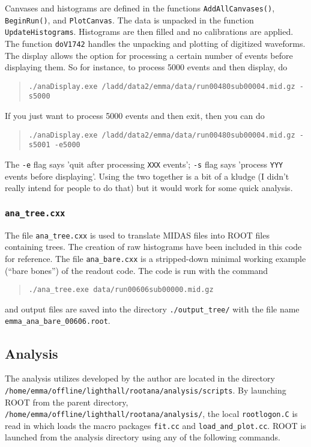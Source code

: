 Canvases and histograms are defined in the functions \texttt{AddAllCanvases()}, \texttt{BeginRun()}, and \texttt{PlotCanvas}. The data is unpacked in the function \texttt{UpdateHistograms}. Histograms are then filled and no calibrations are applied. The function \texttt{doV1742} handles the unpacking and plotting of digitized waveforms.
The display allows the option for processing a certain number of events before displaying them.  So for instance, to process 5000 events and then display, do
\begin{quote}
  \begin{Verbatim}
./anaDisplay.exe /ladd/data2/emma/data/run00480sub00004.mid.gz -s5000
\end{Verbatim}
\end{quote}
If you just want to process 5000 events and then exit, then you can do
\begin{quote}
  \begin{Verbatim}
./anaDisplay.exe /ladd/data2/emma/data/run00480sub00004.mid.gz -s5001 -e5000
\end{Verbatim}
\end{quote}
The \texttt{-e} flag says 'quit after processing \texttt{XXX} events'; \texttt{-s} flag says 'process \texttt{YYY} events before displaying'. Using the two together is a bit of a kludge (I didn't really intend for people to do that) but it would work for some quick analysis.

\subsubsection{\texttt{ana\_tree.cxx}}
The file \texttt{ana\_tree.cxx} is used to translate MIDAS files into ROOT files containing trees. The creation of raw histograms have been included in this code for reference.
The file  \texttt{ana\_bare.cxx} is a stripped-down minimal working example (``bare bones'') of the readout code. 
The code is run with the command
\begin{quote}
  \begin{Verbatim}
./ana_tree.exe data/run00606sub00000.mid.gz   
\end{Verbatim}
\end{quote}
and output files are saved into the directory \verb|./output_tree/| with the file name \verb|emma_ana_bare_00606.root|.
\subsection{Analysis}
The analysis utilizes developed by the author are located in the directory \verb|/home/emma/offline/lighthall/rootana/analysis/scripts|. By launching ROOT from the parent directory, \verb|/home/emma/offline/lighthall/rootana/analysis/|, the local \texttt{rootlogon.C} is read in which loads the macro packages \texttt{fit.cc} and \verb|load_and_plot.cc|. ROOT is launched from the analysis directory using any of the following commands.

